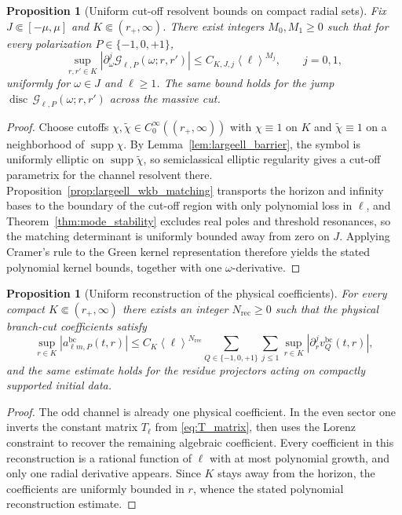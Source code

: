 \documentclass[12pt]{article}
\numberwithin{equation}{section}
\theoremstyle{plain}
\newtheorem{proposition}[theorem]{Proposition}
\theoremstyle{definition}
\theoremstyle{remark}
\newcommand{\disc}{\operatorname{disc}}
\newcommand{\bc}{\mathrm{bc}}
\newcommand{\cG}{\mathcal G}
\newcommand{\om}{\omega}
\newcommand{\angles}[1]{\left\langle #1 \right\rangle}
\newcommand{\abs}[1]{\left|#1\right|}
\begin{document}
\begin{proposition}[Uniform cut-off resolvent bounds on compact radial sets]\label{prop:largeell_uniform_resolvent}
Fix $J\Subset[-\mu,\mu]$ and $K\Subset(r_+,\infty)$.  There exist integers $M_0,M_1\ge0$ such that for every polarization $P\in\{-1,0,+1\}$,
\[
   \sup_{r,r'\in K}\abs{\partial_\omega^j\cG_{\ell,P}(\om;r,r')}
   \le
   C_{K,J,j}\angles{\ell}^{M_j},
   \qquad j=0,1,
\]
uniformly for $\om\in J$ and $\ell\ge1$.  The same bound holds for the jump $\disc\,\cG_{\ell,P}(\om;r,r')$ across the massive cut.
\end{proposition}

\begin{proof}
Choose cutoffs $\chi,\widetilde\chi\in C_0^\infty((r_+,\infty))$ with $\chi\equiv1$ on $K$ and $\widetilde\chi\equiv1$ on a neighborhood of $\operatorname{supp}\chi$.  By Lemma~\ref{lem:largeell_barrier}, the symbol is uniformly elliptic on $\operatorname{supp}\widetilde\chi$, so semiclassical elliptic regularity gives a cut-off parametrix for the channel resolvent there.  Proposition~\ref{prop:largeell_wkb_matching} transports the horizon and infinity bases to the boundary of the cut-off region with only polynomial loss in $\ell$, and Theorem~\ref{thm:mode_stability} excludes real poles and threshold resonances, so the matching determinant is uniformly bounded away from zero on $J$.  Applying Cramer's rule to the Green kernel representation therefore yields the stated polynomial kernel bounds, together with one $\omega$-derivative.
\end{proof}

\begin{proposition}[Uniform reconstruction of the physical coefficients]\label{prop:largeell_reconstruction}
For every compact $K\Subset(r_+,\infty)$ there exists an integer $N_{\mathrm{rec}}\ge0$ such that the physical branch-cut coefficients satisfy
\[
   \sup_{r\in K}\abs{a^{\bc}_{\ell m,P}(t,r)}
   \le
   C_K\angles{\ell}^{N_{\mathrm{rec}}}
   \sum_{Q\in\{-1,0,+1\}}\sum_{j\le1}
   \sup_{r\in K}\abs{\partial_r^j v_Q^{\bc}(t,r)},
\]
and the same estimate holds for the residue projectors acting on compactly supported initial data.
\end{proposition}

\begin{proof}
The odd channel is already one physical coefficient.  In the even sector one inverts the constant matrix $T_\ell$ from \eqref{eq:T_matrix}, then uses the Lorenz constraint to recover the remaining algebraic coefficient.  Every coefficient in this reconstruction is a rational function of $\ell$ with at most polynomial growth, and only one radial derivative appears.  Since $K$ stays away from the horizon, the coefficients are uniformly bounded in $r$, whence the stated polynomial reconstruction estimate.
\end{proof}
\end{document}
